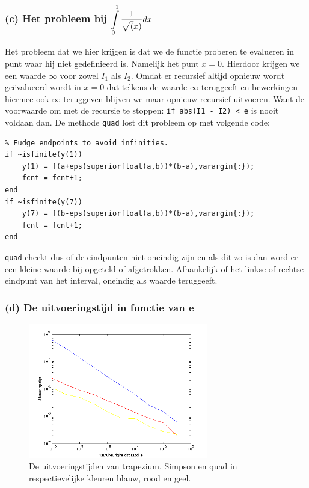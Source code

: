\documentclass[11pt,a4paper]{article}
\begin{document}
\subsubsection*{(c) Het probleem bij $\mathop{\mathlarger{\int\limits_{0}^1\frac{1}{\sqrt(x)}dx}}$}
Het probleem dat we hier krijgen is dat we de functie proberen te evalueren in punt waar hij niet gedefinieerd is. Namelijk het punt $x=0$. Hierdoor krijgen we een waarde $\infty$ voor zowel $I_1$ als $I_2$. Omdat er recursief altijd opnieuw wordt ge\"evalueerd wordt in $x=0$ dat telkens de waarde $\infty$ teruggeeft en bewerkingen hiermee ook $\infty$ teruggeven blijven we maar opnieuw recursief uitvoeren. Want de voorwaarde om met de recursie te stoppen: 
\verb|if abs(I1 - I2) < e| is nooit voldaan dan.
De methode \verb|quad| lost dit probleem op met volgende code:

\begin{verbatim}
% Fudge endpoints to avoid infinities.
if ~isfinite(y(1))
    y(1) = f(a+eps(superiorfloat(a,b))*(b-a),varargin{:});
    fcnt = fcnt+1;
end
if ~isfinite(y(7))
    y(7) = f(b-eps(superiorfloat(a,b))*(b-a),varargin{:});
    fcnt = fcnt+1;
end
\end{verbatim}
\verb|quad| checkt dus of de eindpunten niet oneindig zijn en als dit zo is dan word er een kleine waarde bij opgeteld of afgetrokken. Afhankelijk of het linkse of rechtse eindpunt van het interval, oneindig als waarde teruggeeft.
\subsubsection*{(d) De uitvoeringstijd in functie van e }

\begin{figure}[H]
	\vspace{-20pt}
	\centering
	\includegraphics[width=0.7\textwidth]{12d1.png}
	\caption*{De uitvoeringstijden van trapezium, Simpson en quad in respectievelijke kleuren blauw, rood en geel.}
	\end{figure}
\end{document}
